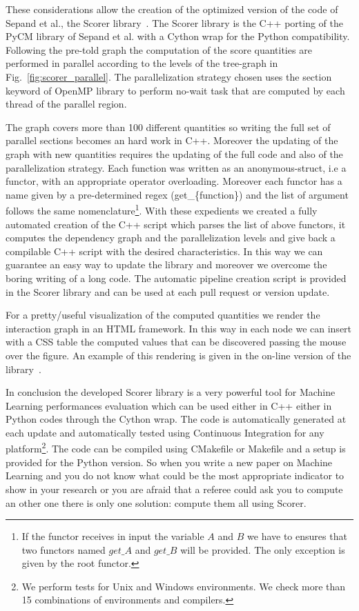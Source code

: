 \documentclass{standalone}
\begin{document}
These considerations allow the creation of the optimized version of the code of Sepand et al., the \textsf{Scorer} library~\cite{Scorer}.
The \textsf{Scorer} library is the \textsf{C++} porting of the \textsf{PyCM} library of Sepand et al. with a \textsf{Cython} wrap for the \textsf{Python} compatibility.
Following the pre-told graph the computation of the score quantities are performed in parallel according to the levels of the tree-graph in Fig.~\ref{fig:scorer_parallel}.
The parallelization strategy chosen uses the \textsf{section} keyword of OpenMP library to perform no-wait task that are computed by each thread of the parallel region.

The graph covers more than 100 different quantities so writing the full set of parallel sections becomes an hard work in \textsf{C++}.
Moreover the updating of the graph with new quantities requires the updating of the full code and also of the parallelization strategy.
Each function was written as an anonymous-struct, i.e a functor, with an appropriate operator overloading.
Moreover each functor has a name given by a pre-determined regex (\textsf{get\_\{function\}}) and the list of argument follows the same nomenclature\footnote{
  If the functor receives in input the variable $A$ and $B$ we have to ensures that two functors named $get\_A$ and $get\_B$ will be provided.
  The only exception is given by the root functor.
}.
With these expedients we created a fully automated creation of the \textsf{C++} script which parses the list of above functors, it computes the dependency graph and the parallelization levels and give back a compilable \textsf{C++} script with the desired characteristics.
In this way we can guarantee an easy way to update the library and moreover we overcome the boring writing of a long code.
The automatic pipeline creation script is provided in the \textsf{Scorer} library and can be used at each pull request or version update.

For a pretty/useful visualization of the computed quantities we render the interaction graph in an HTML framework.
In this way in each node we can insert with a CSS table the computed values that can be discovered passing the mouse over the figure.
An example of this rendering is given in the on-line version of the library~\cite{Scorer}.

In conclusion the developed \textsf{Scorer} library is a very powerful tool for Machine Learning performances evaluation which can be used either in \textsf{C++} either in \textsf{Python} codes through the \textsf{Cython} wrap.
The code is automatically generated at each update and automatically tested using Continuous Integration for any platform\footnote{
  We perform tests for Unix and Windows environments.
  We check more than 15 combinations of environments and compilers.
}.
The code can be compiled using \textsf{CMakefile} or \textsf{Makefile} and a setup is provided for the \textsf{Python} version.
So when you write a new paper on Machine Learning and you do not know what could be the most appropriate indicator to show in your research or you are afraid that a referee could ask you to compute an other one there is only one solution: compute them all using \textsf{Scorer}.
\end{document}
